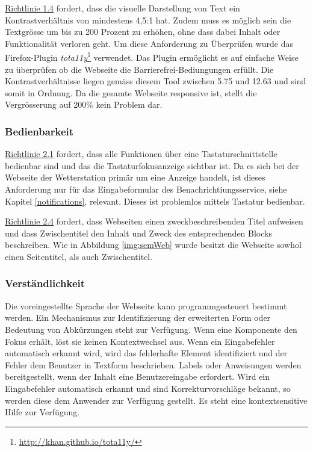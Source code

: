 \noindent
\href{https://www.w3.org/Translations/WCAG20-de/#visual-audio-contrast}{Richtlinie 1.4} fordert, dass die visuelle Darstellung von Text ein Kontrastverhältnis von mindestens 4,5:1 hat. Zudem muss es möglich sein die Textgrösse um bis zu 200 Prozent zu erhöhen, ohne dass dabei Inhalt oder Funktionalität verloren geht. Um diese Anforderung zu Überprüfen wurde das Firefox-Plugin \textit{tota11y}\footnote{\url{http://khan.github.io/tota11y/}} verwendet. Das Plugin ermöglicht es auf einfache Weise zu überprüfen ob die Webseite die Barrierefrei-Bediungungen erfüllt. Die Kontrastverhältnisse liegen gemäss diesem Tool zwischen 5.75 und 12.63 und sind somit in Ordnung. Da die gesamte Webseite responsive ist, stellt die Vergrösserung auf 200\% kein Problem dar.


\subsubsection*{Bedienbarkeit}

\href{https://www.w3.org/Translations/WCAG20-de/#keyboard-operation}{Richtlinie 2.1} fordert, dass alle Funktionen über eine Tastaturschnittstelle bedienbar sind und das die Tastaturfokusanzeige sichtbar ist.
Da es sich bei der Webseite der Wetterstation primär um eine Anzeige handelt, ist dieses Anforderung nur für das Eingabeformular des Benachrichtiungsservice, siehe Kapitel \ref{notifications}, relevant. Dieses ist problemlos mittels Tastatur bedienbar. \newline

\noindent
\href{https://www.w3.org/Translations/WCAG20-de/#navigation-mechanisms}{Richtlinie 2.4} fordert, dass Webseiten einen zweckbeschreibenden Titel aufweisen und dass Zwischentitel den Inhalt und Zweck des entsprechenden Blocks beschreiben. Wie in Abbildung \ref{img:semWeb} wurde besitzt die Webseite sowhol einen Seitentitel, als auch Zwischentitel.


\subsubsection*{Verständlichkeit}

Die voreingestellte Sprache der Webseite kann programmgesteuert bestimmt werden. Ein Mechanismus zur Identifizierung der erweiterten Form oder Bedeutung von Abkürzungen steht zur Verfügung.  Wenn eine Komponente den Fokus erhält, löst sie keinen Kontextwechsel aus.
Wenn ein Eingabefehler automatisch erkannt wird, wird das fehlerhafte Element identifiziert und der Fehler dem Benutzer in Textform beschrieben. Labels oder Anweisungen werden bereitgestellt, wenn der Inhalt eine Benutzereingabe erfordert.  Wird ein Eingabefehler automatisch erkannt und sind Korrekturvorschläge bekannt, so werden diese dem Anwender zur Verfügung gestellt.  Es steht eine kontextsensitive Hilfe zur Verfügung.

